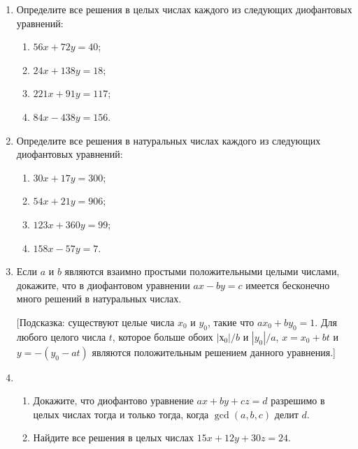 \documentclass[11pt]{article}
\begin{document}
\begin{enumerate}
	\item Определите все решения в целых числах каждого из следующих диофантовых уравнений:
	\begin{enumerate}
		\item $56x + 72y = 40$;
		\item $24x + 138y = 18$;
		\item $221x + 91y = 117$;
		\item $84x - 438y = 156$.
	\end{enumerate}
	\item Определите все решения в натуральных числах каждого из следующих диофантовых уравнений:
	\begin{enumerate}
		\item $30x + 17y = 300$;
		\item $54x + 21y = 906$;
		\item $123x + 360y = 99$;
		\item $158x - 57y = 7$.
	\end{enumerate}
	\item Если $a$ и $b$ являются взаимно простыми положительными целыми числами, докажите, что в диофантовом уравнении $ax - by = c$ имеется бесконечно много решений в натуральных числах.
	
	[Подсказка: существуют целые числа $x_0$ и $y_0$, такие что $ax_0 + by_0 = 1$. Для любого целого числа $t$, которое больше обоих $| х_0 | / b$ и $| y_0 | / a$, $x = x_0 + bt$ и $y = - (y_0 - at)$ являются положительным решением данного уравнения.]
	\item
	\begin{enumerate}
		\item Докажите, что диофантово уравнение $ax + by + cz = d$ разрешимо в целых числах тогда и только тогда, когда $\gcd(a, b, c)$ делит $d$.
		\item Найдите все решения в целых числах $15x + 12y + 30z = 24$.
		

\end{enumerate}
\end{enumerate}
\end{document}
